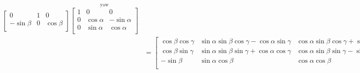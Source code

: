 \begin{align}
{\begin{bmatrix}
     0         & 1 &  0 \\
   -\sin \beta & 0 & \cos \beta \\
  \end{bmatrix}}
  \overset{\text{yaw}}
  {\begin{bmatrix}
    1 &  0          &   0 \\
    0 & \cos \alpha & -\sin \alpha \\
    0 & \sin \alpha &  \cos \alpha \\
  \end{bmatrix}} \\
  &= \begin{bmatrix}
    \cos\beta\cos\gamma & \sin\alpha\sin\beta\cos\gamma - \cos\alpha\sin\gamma & \cos\alpha\sin\beta\cos\gamma + \sin\alpha\sin\gamma \\
    \cos\beta\sin\gamma & \sin\alpha\sin\beta\sin\gamma + \cos\alpha\cos\gamma & \cos\alpha\sin\beta\sin\gamma - \sin\alpha\cos\gamma \\
    -\sin\beta          & \sin\alpha\cos\beta                                  & \cos\alpha\cos\beta \\
  \end{bmatrix}
\end{align}